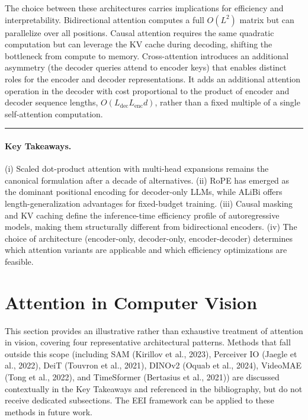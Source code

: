 \documentclass[10pt,twocolumn]{article}
\begin{document}
The choice between these architectures carries implications for efficiency and interpretability. Bidirectional attention computes a full $O(L^2)$ matrix but can parallelize over all positions. Causal attention requires the same quadratic computation but can leverage the KV cache during decoding, shifting the bottleneck from compute to memory. Cross-attention introduces an additional asymmetry (the decoder queries attend to encoder keys) that enables distinct roles for the encoder and decoder representations. It adds an additional attention operation in the decoder with cost proportional to the product of encoder and decoder sequence lengths, $O(L_{\mathrm{dec}}L_{\mathrm{enc}}d)$, rather than a fixed multiple of a single self-attention computation.

\begin{center}\rule{0.5\linewidth}{0.5pt}\end{center}
\paragraph{Key Takeaways.} (i) Scaled dot-product attention with multi-head expansions remains the canonical formulation after a decade of alternatives. (ii) RoPE has emerged as the dominant positional encoding for decoder-only LLMs, while ALiBi offers length-generalization advantages for fixed-budget training. (iii) Causal masking and KV caching define the inference-time efficiency profile of autoregressive models, making them structurally different from bidirectional encoders. (iv) The choice of architecture (encoder-only, decoder-only, encoder-decoder) determines which attention variants are applicable and which efficiency optimizations are feasible.

\section{Attention in Computer Vision}\label{attention-in-computer-vision}

This section provides an illustrative rather than exhaustive treatment of attention in vision, covering four representative architectural patterns. Methods that fall outside this scope (including SAM (Kirillov et al., 2023), Perceiver IO (Jaegle et al., 2022), DeiT (Touvron et al., 2021), DINOv2 (Oquab et al., 2024), VideoMAE (Tong et al., 2022), and TimeSformer (Bertasius et al., 2021)) are discussed contextually in the Key Takeaways and referenced in the bibliography, but do not receive dedicated subsections. The EEI framework can be applied to these methods in future work.
\end{document}
